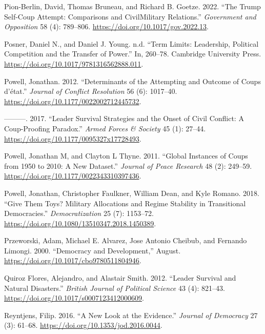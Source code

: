 \documentclass[
  12pt,
]{report}
\newlength{\cslhangindent}
\newenvironment{CSLReferences}[2] %
 {\begin{list}{}{%
  \setlength{\itemindent}{0pt}
  \setlength{\leftmargin}{0pt}
  \setlength{\parsep}{0pt}
  \ifodd #1
   \setlength{\leftmargin}{\cslhangindent}
   \setlength{\itemindent}{-1\cslhangindent}
  \fi
  \setlength{\itemsep}{#2\baselineskip}}}
 {\end{list}}
\begin{document}
\begin{CSLReferences}{1}{0}
Pion-Berlin, David, Thomas Bruneau, and Richard B. Goetze. 2022. {``The
Trump Self-Coup Attempt: Comparisons and Civil{\textendash}Military
Relations.''} \emph{Government and Opposition} 58 (4): 789--806.
\url{https://doi.org/10.1017/gov.2022.13}.

Posner, Daniel N., and Daniel J. Young. n.d. {``Term Limits: Leadership,
Political Competition and the Transfer of Power.''} In, 260--78.
Cambridge University Press.
\url{https://doi.org/10.1017/9781316562888.011}.

Powell, Jonathan. 2012. {``Determinants of the Attempting and Outcome of
Coups d{'}état.''} \emph{Journal of Conflict Resolution} 56 (6):
1017--40. \url{https://doi.org/10.1177/0022002712445732}.

---------. 2017. {``Leader Survival Strategies and the Onset of Civil
Conflict: A Coup-Proofing Paradox.''} \emph{Armed Forces \& Society} 45
(1): 27--44. \url{https://doi.org/10.1177/0095327x17728493}.

Powell, Jonathan M, and Clayton L Thyne. 2011. {``Global Instances of
Coups from 1950 to 2010: A New Dataset.''} \emph{Journal of Peace
Research} 48 (2): 249--59.
\url{https://doi.org/10.1177/0022343310397436}.

Powell, Jonathan, Christopher Faulkner, William Dean, and Kyle Romano.
2018. {``Give Them Toys? Military Allocations and Regime Stability in
Transitional Democracies.''} \emph{Democratization} 25 (7): 1153--72.
\url{https://doi.org/10.1080/13510347.2018.1450389}.

Przeworski, Adam, Michael E. Alvarez, Jose Antonio Cheibub, and Fernando
Limongi. 2000. {``Democracy and Development,''} August.
\url{https://doi.org/10.1017/cbo9780511804946}.

Quiroz Flores, Alejandro, and Alastair Smith. 2012. {``Leader Survival
and Natural Disasters.''} \emph{British Journal of Political Science} 43
(4): 821--43. \url{https://doi.org/10.1017/s0007123412000609}.

Reyntjens, Filip. 2016. {``A New Look at the Evidence.''} \emph{Journal
of Democracy} 27 (3): 61--68.
\url{https://doi.org/10.1353/jod.2016.0044}.


\end{CSLReferences}
\end{document}
